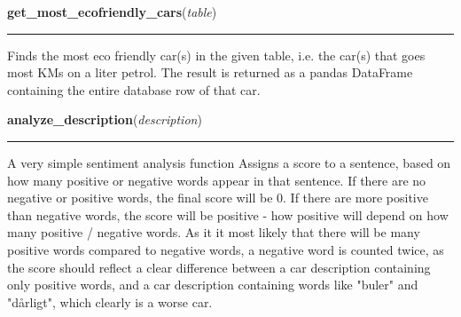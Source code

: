     \vspace{0.5ex}

\hspace{.8\funcindent}\begin{boxedminipage}{\funcwidth}

    \raggedright \textbf{get\_most\_ecofriendly\_cars}(\textit{table})

    \vspace{-1.5ex}

    \rule{\textwidth}{0.5\fboxrule}
\setlength{\parskip}{2ex}
    Finds the most eco friendly car(s) in the given table, i.e. the car(s) 
    that goes most KMs on a liter petrol. The result is returned as a 
    pandas DataFrame containing the entire database row of that car.

\setlength{\parskip}{1ex}
    \end{boxedminipage}

    \label{BilbasenDataMining:datamining:analyze_description}

    \vspace{0.5ex}

\hspace{.8\funcindent}\begin{boxedminipage}{\funcwidth}

    \raggedright \textbf{analyze\_description}(\textit{description})

    \vspace{-1.5ex}

    \rule{\textwidth}{0.5\fboxrule}
\setlength{\parskip}{2ex}
    A very simple sentiment analysis function Assigns a score to a 
    sentence, based on how many positive or negative words appear in that 
    sentence. If there are no negative or positive words,     the final 
    score will be 0. If there are more positive than negative words, the 
    score will be positive - how positive will depend on how many positive 
    / negative words. As it it most likely that there will be many positive
    words compared to negative words, a negative word is counted twice, as 
    the score should reflect a clear difference between a car description 
    containing only positive words, and a car description containing words 
    like "buler" and "dårligt", which clearly is a worse car.

\setlength{\parskip}{1ex}
    \end{boxedminipage}

